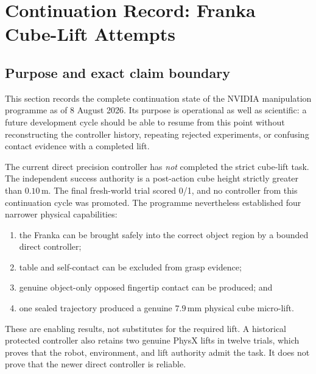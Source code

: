 
\section{Continuation Record: Franka Cube-Lift Attempts}
\label{sec:cube-lift-continuation-20260808}

\subsection{Purpose and exact claim boundary}

This section records the complete continuation state of the NVIDIA manipulation
programme as of 8 August 2026.  Its purpose is operational as well as
scientific: a future development cycle should be able to resume from this
point without reconstructing the controller history, repeating rejected
experiments, or confusing contact evidence with a completed lift.

The current direct precision controller has \emph{not} completed the strict
cube-lift task.  The independent success authority is a post-action cube
height strictly greater than $0.10\,\mathrm{m}$.  The final fresh-world trial
scored 0/1, and no controller from this continuation cycle was promoted.  The
programme nevertheless established four narrower physical capabilities:

\begin{enumerate}
  \item the Franka can be brought safely into the correct object region by a
        bounded direct controller;
  \item table and self-contact can be excluded from grasp evidence;
  \item genuine object-only opposed fingertip contact can be produced; and
  \item one sealed trajectory produced a genuine $7.9\,\mathrm{mm}$ physical
        cube micro-lift.
\end{enumerate}

These are enabling results, not substitutes for the required lift.  A
historical protected controller also retains two genuine PhysX lifts in twelve
trials, which proves that the robot, environment, and lift authority admit the
task.  It does not prove that the newer direct controller is reliable.

